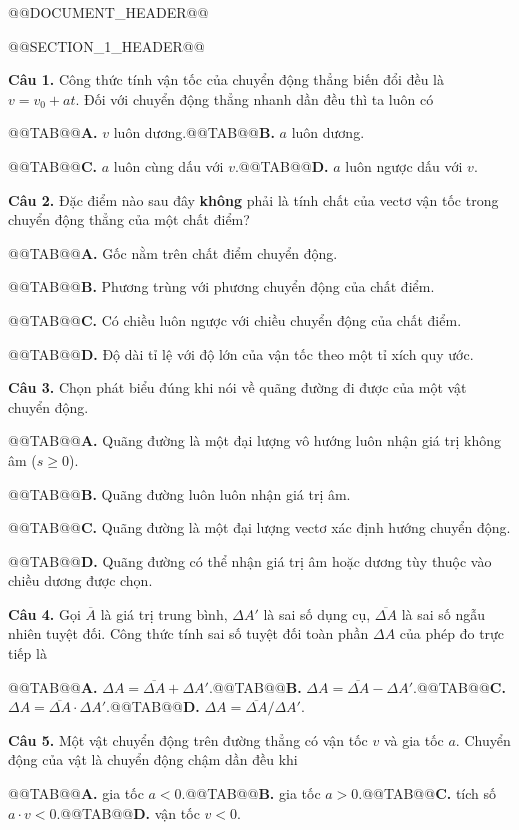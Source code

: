 \documentclass{article}
\begin{document}
@@DOCUMENT_HEADER@@

@@SECTION_1_HEADER@@

\textbf{Câu 1.} Công thức tính vận tốc của chuyển động thẳng biến đổi đều là $v = v_0 + at$. Đối với chuyển động thẳng nhanh dần đều thì ta luôn có

@@TAB@@\textbf{A.} $v$ luôn dương.@@TAB@@\textbf{B.} $a$ luôn dương.

@@TAB@@\textbf{C.} $a$ luôn cùng dấu với $v$.@@TAB@@\textbf{D.} $a$ luôn ngược dấu với $v$.

\textbf{Câu 2.} Đặc điểm nào sau đây \textbf{không} phải là tính chất của vectơ vận tốc trong chuyển động thẳng của một chất điểm?

@@TAB@@\textbf{A.} Gốc nằm trên chất điểm chuyển động.

@@TAB@@\textbf{B.} Phương trùng với phương chuyển động của chất điểm.

@@TAB@@\textbf{C.} Có chiều luôn ngược với chiều chuyển động của chất điểm.

@@TAB@@\textbf{D.} Độ dài tỉ lệ với độ lớn của vận tốc theo một tỉ xích quy ước.

\textbf{Câu 3.} Chọn phát biểu đúng khi nói về quãng đường đi được của một vật chuyển động.

@@TAB@@\textbf{A.} Quãng đường là một đại lượng vô hướng luôn nhận giá trị không âm ($s \ge 0$).

@@TAB@@\textbf{B.} Quãng đường luôn luôn nhận giá trị âm.

@@TAB@@\textbf{C.} Quãng đường là một đại lượng vectơ xác định hướng chuyển động.

@@TAB@@\textbf{D.} Quãng đường có thể nhận giá trị âm hoặc dương tùy thuộc vào chiều dương được chọn.

\textbf{Câu 4.} Gọi $\overline{A}$ là giá trị trung bình, $\Delta A'$ là sai số dụng cụ, $\overline{\Delta A}$ là sai số ngẫu nhiên tuyệt đối. Công thức tính sai số tuyệt đối toàn phần $\Delta A$ của phép đo trực tiếp là

@@TAB@@\textbf{A.} $\Delta A = \overline{\Delta A} + \Delta A'$.@@TAB@@\textbf{B.} $\Delta A = \overline{\Delta A} - \Delta A'$.@@TAB@@\textbf{C.} $\Delta A = \overline{\Delta A} \cdot \Delta A'$.@@TAB@@\textbf{D.} $\Delta A = \overline{\Delta A} / \Delta A'$.

\textbf{Câu 5.} Một vật chuyển động trên đường thẳng có vận tốc $v$ và gia tốc $a$. Chuyển động của vật là chuyển động chậm dần đều khi

@@TAB@@\textbf{A.} gia tốc $a < 0$.@@TAB@@\textbf{B.} gia tốc $a > 0$.@@TAB@@\textbf{C.} tích số $a \cdot v < 0$.@@TAB@@\textbf{D.} vận tốc $v < 0$.
\end{document}
